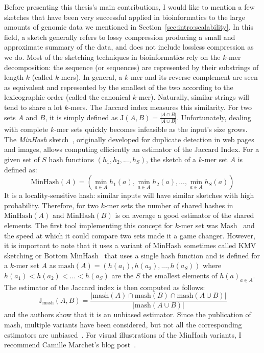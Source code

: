 Before presenting this thesis's main contributions, I would like to mention a few sketches that have been very successful applied in bioinformatics to the large amounts of genomic data we mentioned in Section~\ref{sec:intro:scalability}.
In this field, a sketch generally refers to lossy compression producing a small and approximate summary of the data, and does not include lossless compression as we do.
Most of the sketching techniques in bioinformatics rely on the $k$-mer decomposition: the sequence (or sequences) are represented by their substrings of length $k$ (called $k$-mers). In general, a $k$-mer and its reverse complement are seen as equivalent and represented by the smallest of the two according to the lexicographic order (called the canonical $k$-mer).
Naturally, similar strings will tend to share a lot $k$-mers. The Jaccard index measures this similarity. For two sets $A$ and $B$, it is simply defined as $ \mathrm{J}(A,B) = \frac{|A\cap B|}{|A \cup B|} $.
Unfortunately, dealing with complete $k$-mer sets quickly becomes infeasible as the input's size grows. 
The \textit{MinHash} sketch~\cite{MinHash97}, originally developed for duplicate detection in web pages and images, allows computing efficiently an estimator of the Jaccard Index. 
For a given set of $S$ hash functions $(h_1,h_2,...,h_S)$, the sketch of a $k$-mer set $A$ is defined as: $$ \mathrm{MinHash}(A) = (\min_{a \in A} h_1(a), \min_{a \in A} h_2(a), ..., \min_{a \in A} h_S(a) ) $$
%
It is a locality-sensitive hash: similar inputs will have similar sketches with high probability. Therefore, for two $k$-mer sets the number of shared hashes in $\mathrm{MinHash}(A)$ and $\mathrm{MinHash}(B)$ is on average a good estimator of the shared elements.
The first tool implementing this concept for $k$-mer set was Mash~\cite{ondov2016mash} and the speed at which it could compare two sets made it a game changer. However, it is important to note that it uses a variant of MinHash sometimes called KMV sketching or Bottom MinHash~\cite{bar2002counting} that uses a single hash function and is defined for a $k$-mer set $A$ as $\mathrm{mash}(A)=(h(a_1),h(a_2),...,h(a_S))$ where $h(a_1) < h(a_2) < ... <h(a_S)$ are the $S$ the smallest elements of ${h(a)}_{a\in A}$.
The estimator of the Jaccard index is then computed as follows: $$ \mathrm{J}_{\mathrm{mash}}(A,B) = \frac{|\mathrm{mash}(A)\cap \mathrm{mash}(B) \cap \mathrm{mash}(A \cup B) |}{|\mathrm{mash}(A \cup B)|}$$
and the authors show that it is an unbiased estimator. Since the publication of mash, multiple variants have been considered, but not all the corresponding estimators are unbiased~\cite{10.1093/bioinformatics/btac244}. For visual illustrations of the MinHash variants, I recommend Camille Marchet's blog post~\cite{camsketch}.
